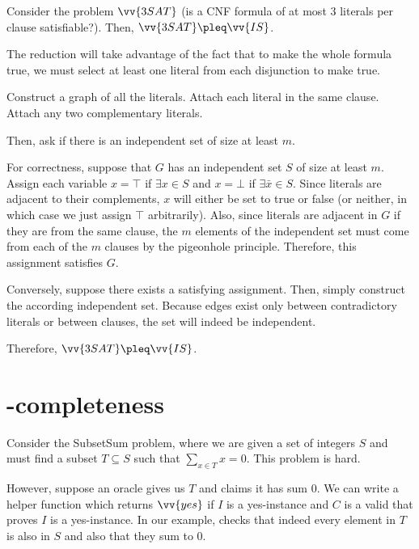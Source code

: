 \begin{prop}
  Consider the problem $\vv{3SAT}$ (is a CNF formula of at most 3 literals per clause satisfiable?).
  Then, $\vv{3SAT} \pleq \vv{IS}$.
\end{prop}
\begin{prf}
  The reduction will take advantage of the fact that to make the whole formula true,
  we must select at least one literal from each disjunction to make true.

  Construct a graph of all the literals.
  Attach each literal in the same clause.
  Attach any two complementary literals.

  Then, ask if there is an independent set of size at least $m$.

  For correctness, suppose that $G$ has an independent set $S$ of size at least $m$.
  Assign each variable $x = \top$ if $\exists x \in S$ and $x = \bot$ if $\exists \bar x \in S$.
  Since literals are adjacent to their complements, $x$ will either be set to true or false
  (or neither, in which case we just assign $\top$ arbitrarily).
  Also, since literals are adjacent in $G$ if they are from the same clause,
  the $m$ elements of the independent set must come from each of the $m$ clauses
  by the pigeonhole principle.
  Therefore, this assignment satisfies $G$.

  Conversely, suppose there exists a satisfying assignment.
  Then, simply construct the according independent set.
  Because edges exist only between contradictory literals
  or between clauses, the set will indeed be independent.

  Therefore, $\vv{3SAT} \pleq \vv{IS}$.
\end{prf}

\section{\NP-completeness}

Consider the \textsf{SubsetSum} problem,
where we are given a set of integers $S$
and must find a subset $T \subseteq S$ such that $\sum_{x \in T}x = 0$.
This problem is hard.

However, suppose an oracle gives us $T$ and claims it has sum 0.
We can write a helper function 
which returns $\vv{yes}$ if $I$ is a yes-instance
and $C$ is a valid  that proves $I$ is a yes-instance.
In our example,  checks that indeed
every element in $T$ is also in $S$ and also that they sum to 0.

